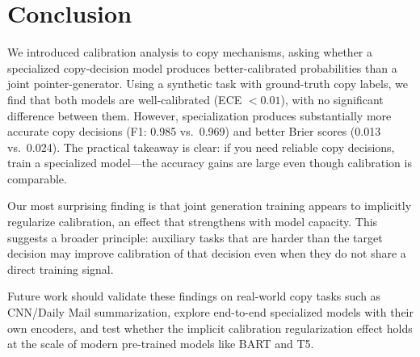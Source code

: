 \section{Conclusion}
\label{sec:conclusion}

We introduced calibration analysis to copy mechanisms, asking whether a specialized copy-decision model produces better-calibrated probabilities than a joint pointer-generator. Using a synthetic task with ground-truth copy labels, we find that both models are well-calibrated (ECE $< 0.01$), with no significant difference between them. However, specialization produces substantially more accurate copy decisions (F1: 0.985 vs.\ 0.969) and better Brier scores (0.013 vs.\ 0.024). The practical takeaway is clear: if you need reliable copy decisions, train a specialized model---the accuracy gains are large even though calibration is comparable.

Our most surprising finding is that joint generation training appears to implicitly regularize calibration, an effect that strengthens with model capacity. This suggests a broader principle: auxiliary tasks that are harder than the target decision may improve calibration of that decision even when they do not share a direct training signal.

Future work should validate these findings on real-world copy tasks such as CNN/Daily Mail summarization, explore end-to-end specialized models with their own encoders, and test whether the implicit calibration regularization effect holds at the scale of modern pre-trained models like BART and T5.